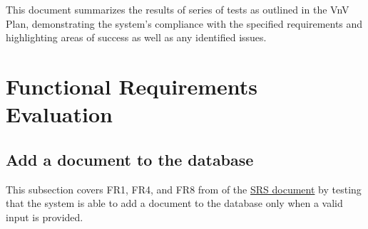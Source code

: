 \documentclass[12pt, titlepage]{article}
\begin{document}

\newpage

\tableofcontents

\listoftables 

\listoffigures

\newpage


This document summarizes the results of series of tests as outlined in the VnV Plan, demonstrating the system's compliance with the specified requirements and highlighting areas of success as well as any identified issues. \\

\section{Functional Requirements Evaluation} \label{section:3} 

\subsection{Add a document to the database} \label{section:3.1}

This subsection covers FR1, FR4, and FR8 from of the \href{https://github.com/Inreet-Kaur/capstone/blob/main/docs/SRS/SRS.pdf}{SRS document} by testing that the system is able to add a document to the database only when a valid input is provided.
\end{document}
